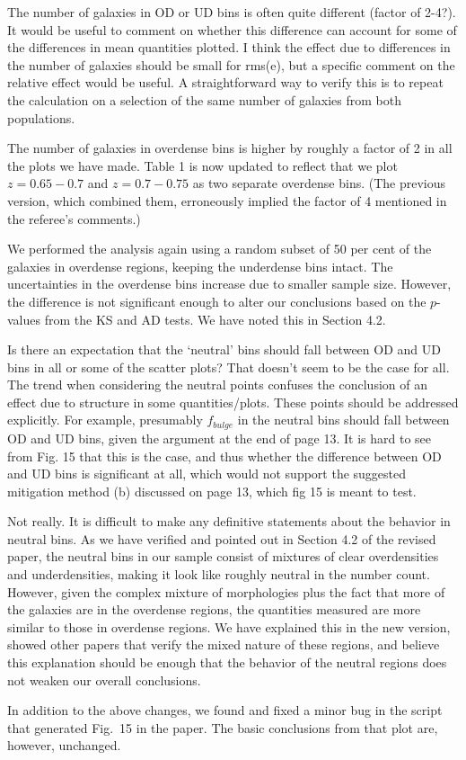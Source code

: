 \documentclass[english]{letter}
\begin{document}
\begin{shaded}
The number of galaxies in OD or UD bins is often quite different (factor of 2-4?). It would be useful to comment on whether this difference can account for some of the differences in mean quantities plotted. I think the effect due to differences in the number of galaxies should be small for rms(e), but a specific comment on the relative effect would be useful. A straightforward way to verify this is to repeat the calculation on a selection of the same number of galaxies from both populations.
\end{shaded}
\noindent 
The number of
galaxies in overdense bins is higher by roughly a factor of 2 in all the plots we have made. Table 1
is now updated to reflect that we plot $z=0.65-0.7$ and $z=0.7-0.75$ as two separate overdense bins.
(The previous version, which combined them, erroneously implied the factor of 4 mentioned in the
referee's comments.)

We performed the analysis again using a random subset of 50 per cent of the galaxies in overdense
regions, keeping the underdense bins intact. The uncertainties in the overdense bins increase due
to smaller sample size. However, the difference is not significant enough to alter our conclusions
based on the $p$-values from the KS and AD tests. We have noted this in Section 4.2.

\begin{shaded}
Is there an expectation that the `neutral' bins should fall between OD and UD bins in all or some of the scatter plots? That doesn't seem to be the case for all. The trend when considering the neutral points confuses the conclusion of an effect due to structure in some quantities/plots. These points should be addressed explicitly. For example, presumably $f_{bulge}$ in the neutral bins should fall between OD and UD bins, given the argument at the end of page 13. It is hard to see from Fig. 15 that this is the case, and thus whether the difference between OD and UD bins is significant at all, which would not support the suggested mitigation method (b) discussed on page 13, which fig 15 is meant to test.
\end{shaded}

Not really. It is difficult to make any definitive statements about the behavior in neutral bins. As
we have verified and pointed out in Section 4.2 of the revised paper,
the neutral bins in our sample consist of mixtures of clear overdensities and underdensities, making
it look like roughly neutral in the number count. However, given the complex mixture of morphologies
plus the fact that more of the galaxies are in the overdense regions, the quantities measured are
more similar to those in overdense regions.  We have explained this in the new version, showed other
papers that verify the mixed nature of these regions, and believe this explanation should be enough
that the behavior of the neutral regions does not weaken our overall conclusions.

In addition to the above changes, we found and fixed a minor bug in the script that generated
Fig.~15 in the paper.  The basic conclusions from that plot are, however, unchanged.
\end{document}
